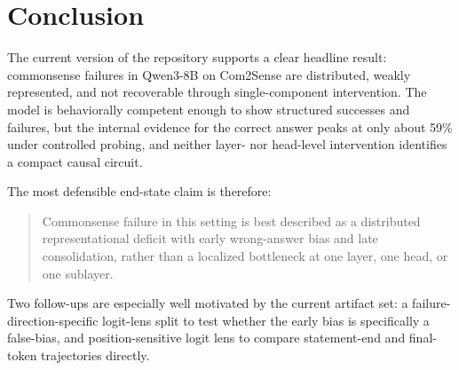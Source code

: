 \documentclass{article}
\begin{document}
\section{Conclusion}

The current version of the repository supports a clear headline result: commonsense failures in Qwen3-8B on Com2Sense are distributed, weakly represented, and not recoverable through single-component intervention. The model is behaviorally competent enough to show structured successes and failures, but the internal evidence for the correct answer peaks at only about 59\% under controlled probing, and neither layer- nor head-level intervention identifies a compact causal circuit.

The most defensible end-state claim is therefore:

\begin{quote}
Commonsense failure in this setting is best described as a distributed representational deficit with early wrong-answer bias and late consolidation, rather than a localized bottleneck at one layer, one head, or one sublayer.
\end{quote}

Two follow-ups are especially well motivated by the current artifact set: a failure-direction-specific logit-lens split to test whether the early bias is specifically a false-bias, and position-sensitive logit lens to compare statement-end and final-token trajectories directly.
\end{document}
